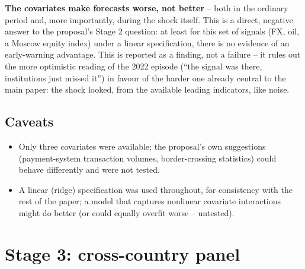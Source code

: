 \documentclass[11pt]{article}
\begin{document}
\textbf{The covariates make forecasts worse, not better} -- both in the ordinary period and,
more importantly, during the shock itself. This is a direct, negative answer to the proposal's
Stage 2 question: at least for this set of signals (FX, oil, a Moscow equity index) under a
linear specification, there is no evidence of an early-warning advantage. This is reported as a
finding, not a failure -- it rules out the more optimistic reading of the 2022 episode (``the
signal was there, institutions just missed it'') in favour of the harder one already central to
the main paper: the shock looked, from the available leading indicators, like noise.

\subsection*{Caveats}
\begin{itemize}
\item Only three covariates were available; the proposal's own suggestions (payment-system
  transaction volumes, border-crossing statistics) could behave differently and were not tested.
\item A linear (ridge) specification was used throughout, for consistency with the rest of the
  paper; a model that captures nonlinear covariate interactions might do better (or could
  equally overfit worse -- untested).
\end{itemize}

\section{Stage 3: cross-country panel}
\end{document}
